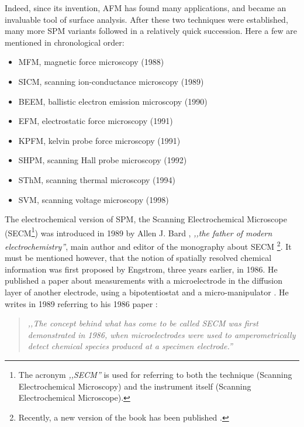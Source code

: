 Indeed, since its invention, AFM has found many applications, and became an invaluable tool of surface analysis.
After these two techniques were established, many more SPM variants followed in a relatively quick succession.
Here a few are mentioned in chronological order:

\begin{itemize}
\item MFM, magnetic force microscopy (1988) \cite{hartmann1988magnetic}
\item SICM, scanning ion-conductance microscopy (1989) \cite{hansma1989scanning}
\item BEEM, ballistic electron emission microscopy (1990) \cite{kaiser1990direct}
\item EFM, electrostatic force microscopy (1991) \cite{weaver1991high}
\item KPFM, kelvin probe force microscopy (1991) \cite{nonnenmacher1991kelvin}
\item SHPM, scanning Hall probe microscopy (1992) \cite{chang1992scanning}
\item SThM, scanning thermal microscopy (1994) \cite{xu1994thermal}
\item SVM, scanning voltage microscopy (1998) \cite{trenkler1998nanopotentiometry}
\end{itemize}

The electrochemical version of SPM, the Scanning Electrochemical Microscope (SECM\footnote{The acronym \emph{,,SECM''} is used for referring to both the technique (Scanning Electrochemical Microscopy) and the instrument itself (Scanning Electrochemical Microscope).}) was introduced in 1989 by Allen J. Bard \cite{bard1989scanning}, \emph{,,the father of modern electrochemistry''}, main author and editor of the monography about SECM \cite{bard1994scanning}\footnote{Recently, a new version of the book has been published \cite{bard2012scanning}.}.
It must be mentioned however, that the notion of spatially resolved chemical information was first proposed by Engstrom, three years earlier, in 1986.
He published a paper about measurements with a microelectrode in the diffusion layer of another electrode, using a bipotentiostat and a micro-manipulator \cite{engstrom1986measurements}.
He writes in 1989 \cite{engstrom1989scanning} referring to his 1986 paper \cite{engstrom1986measurements}:

\begin{quote}
\vspace{0.5cm}
\emph{,,The concept behind what has come to be called SECM was first demonstrated in 1986, when microelectrodes were used to amperometrically detect chemical species produced at a specimen electrode.''}
\vspace{0.5cm}
\end{quote}

